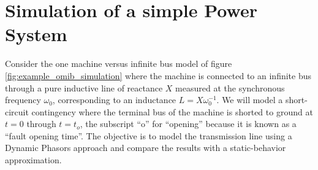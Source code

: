 \section{Simulation of a simple Power System}\label{sec:omib_dynphasor_sim} %

	Consider the one machine versus infinite bus model of figure \ref{fig:example_omib_simulation} where the machine is connected to an infinite bus through a pure inductive line of reactance $X$ measured at the synchronous frequency $\omega_0$, corresponding to an inductance $L = X\omega_0^{-1}$. We will model a short-circuit contingency where the terminal bus of the machine is shorted to ground at $t = 0$ through $t = t_o$, the subscript ``o'' for ``opening'' because it is known as a ``fault opening time''. The objective is to model the transmission line using a Dynamic Phasors approach and compare the results with a static-behavior approximation.

